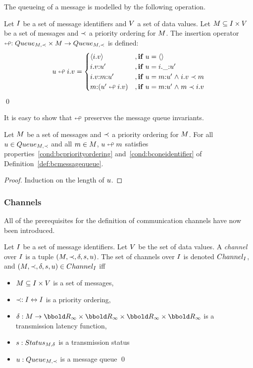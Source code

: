 The queueing of a message is modelled by the following operation.
\begin{definition}
Let $I$ be a set of message identifiers and $V$ a set of data
values.  Let ${M} \subseteq I \times V$ be a set of messages and
$\prec$ a priority ordering for ${M}$. The insertion operator $\mathrel{\looparrowleft} :
{Queue_{{M},\prec}} \times M \rightarrow {Queue_{{M},\prec}}$ is defined:
\[
u \mathrel{\looparrowleft} {i}.{v} =
\begin{cases}
\langle {i}.{v} \rangle & ,{\mathbf{if}}\; u = {\langle\rangle} \\
{i}.{v} {:} u' & ,{\mathbf{if}}\; u = {i}.\_ {:} u' \\
{i}.{v} {:} {m} {:} u' & ,{\mathbf{if}}\; u = {m} {:} u' \mathrel{\wedge} {i}.{v} \prec {m} \\
{m} {:} (u' \mathrel{\looparrowleft} {i}.{v}) & ,{\mathbf{if}}\; u = {m} {:} u' \mathrel{\wedge} {m} \prec {i}.{v}
\end{cases}
\]
\qed
\end{definition}
It is easy to show that $\mathrel{\looparrowleft}$ preserves the message queue invariants.
\begin{proposition}
Let ${M}$ be a set of messages and
$\prec$ a priority ordering for ${M}$.  For all $u \in
{Queue_{{M},\prec}}$ and all ${m} \in {M}$, $u \mathrel{\looparrowleft}
{m}$ satisfies properties~\ref{cond:bcpriorityordering}
and~\ref{cond:bconeidentifier} of Definition~\ref{def:bcmessagequeue}.
\end{proposition}
\begin{proof}
Induction on the length of $u$.
\end{proof}

\subsubsection{Channels}
All of the prerequisites for the definition of communication channels
have now been introduced.

\begin{definition}[Channel]
Let $I$ be a set of message identifiers. Let $V$ be the set of data
values. A \emph{channel} over $I$ is a tuple
$({M},\prec,\delta,{s},u)$. The set of channels over $I$ is
denoted ${Channel_{I}}$, and $({M},\prec,\delta,{s},u) \in
{Channel_{I}}$ iff
\begin{itemize}
\item ${M} \subseteq I \times V$ is a set of messages,
\item $\prec : I \leftrightarrow I$ is a priority ordering,
\item $\latency : \M \fun \TimeInf \cross \TimeInf \cross \TimeInf \cross 
  \TimeInf$ is a transmission latency function, 
\item ${s} : {Status_{{M},\delta}}$ is a transmission status
\item $u : {Queue_{{M},\prec}}$ is a message queue
\qed
\end{itemize}
\end{definition}

